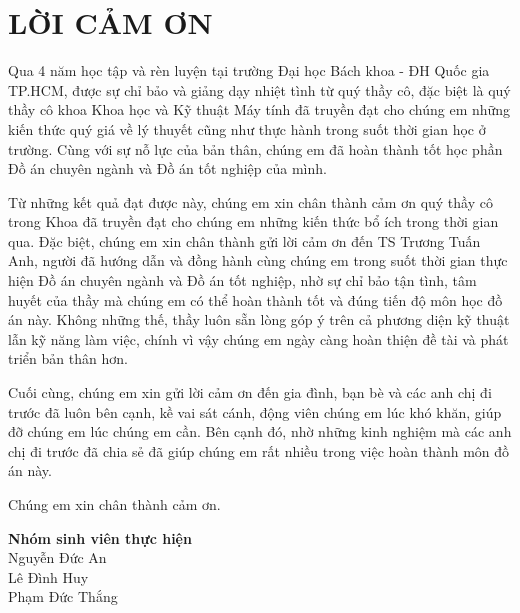 \clearpage
\section*{LỜI CẢM ƠN}

Qua 4 năm học tập và rèn luyện tại trường Đại học Bách khoa - ĐH Quốc gia TP.HCM, được sự chỉ bảo và giảng dạy nhiệt tình từ quý thầy cô, đặc biệt là quý thầy cô khoa Khoa học và Kỹ thuật Máy tính đã truyền đạt cho chúng em những kiến thức quý
giá về lý thuyết cũng như thực hành trong suốt thời gian học ở trường. Cùng với sự nỗ lực của bản thân, chúng em đã hoàn thành tốt học phần Đồ án chuyên ngành và Đồ án tốt nghiệp của mình.
\vspace{0.5cm}

Từ những kết quả đạt được này, chúng em xin chân thành cảm ơn quý thầy cô trong Khoa đã truyền đạt cho chúng em những kiến thức bổ ích trong thời gian qua. Đặc biệt,
chúng em xin chân thành gửi lời cảm ơn đến TS Trương Tuấn Anh, người đã hướng dẫn và đồng hành cùng chúng em trong suốt thời gian thực hiện Đồ án chuyên ngành và Đồ án tốt nghiệp, nhờ sự chỉ bảo tận tình, tâm huyết của thầy mà chúng em có thể hoàn thành tốt và đúng tiến độ môn học đồ án này. Không những thế, thầy luôn sẵn lòng góp ý trên cả
phương diện kỹ thuật lẫn kỹ năng làm việc, chính vì vậy chúng em ngày càng hoàn thiện đề tài và phát triển bản thân hơn.
\vspace{0.5cm}

Cuối cùng, chúng em xin gửi lời cảm ơn đến gia đình, bạn bè và các anh chị đi trước đã luôn bên cạnh, kề vai sát cánh, động viên chúng em lúc khó khăn, giúp đỡ chúng em lúc chúng em cần. Bên cạnh đó, nhờ những kinh nghiệm mà các anh chị đi trước đã chia sẻ đã giúp chúng em rất nhiều trong việc hoàn thành môn đồ án này.
\vspace{0.5cm}

Chúng em xin chân thành cảm ơn.


\vspace{1cm}

\hfill %
\begin{minipage}{0.4\textwidth}
\centering %
    \textbf{Nhóm sinh viên thực hiện} \\[0.5cm]
    Nguyễn Đức An \\[0.2cm]
    Lê Đình Huy \\[0.2cm]
    Phạm Đức Thắng
\end{minipage}
